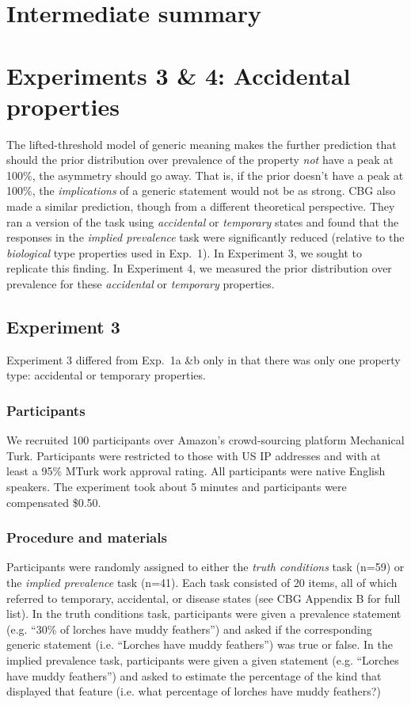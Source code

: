 \documentclass[10pt,letterpaper]{article}
\begin{document}
\section{Intermediate summary}


\section{Experiments 3 \& 4: Accidental properties}

The lifted-threshold model of generic meaning makes the further prediction that should the prior distribution over prevalence of the property \emph{not} have a peak at 100\%, the asymmetry should go away. That is, if the prior doesn't have a peak at 100\%, the \emph{implications} of a generic statement would not be as strong. CBG also made a similar prediction, though from a different theoretical perspective. They ran a version of the task using \emph{accidental} or \emph{temporary} states and found that the responses in the \emph{implied prevalence} task were significantly reduced (relative to the \emph{biological} type properties used in Exp.~1). In Experiment 3, we sought to replicate this finding. In Experiment 4, we measured the prior distribution over prevalence for these \emph{accidental} or \emph{temporary} properties.

\subsection{Experiment 3}

Experiment 3 differed from Exp.~1a \&b only in that there was only one property type: accidental or temporary properties. 

\subsubsection{Participants}

We recruited 100 participants over Amazon's crowd-sourcing platform Mechanical Turk. Participants were restricted to those with US IP addresses and with at least a 95\% MTurk work approval rating. All participants were native English speakers. The experiment took about 5 minutes and participants were compensated \$0.50.

\subsubsection{Procedure and materials}

Participants were randomly assigned to either the \emph{truth conditions} task (n=59) or the \emph{implied prevalence} task (n=41). Each task consisted of 20 items, all of which referred to temporary, accidental, or disease states (see CBG Appendix B for full list). In the truth conditions task, participants were given a prevalence statement (e.g. ``30\% of lorches have muddy feathers'') and asked if the corresponding generic statement (i.e. ``Lorches have muddy feathers'') was true or false. In the implied prevalence task, participants were given a given statement (e.g. ``Lorches have muddy feathers'') and asked to estimate the percentage of the kind that displayed that feature (i.e. what percentage of lorches have muddy feathers?)
\end{document}
